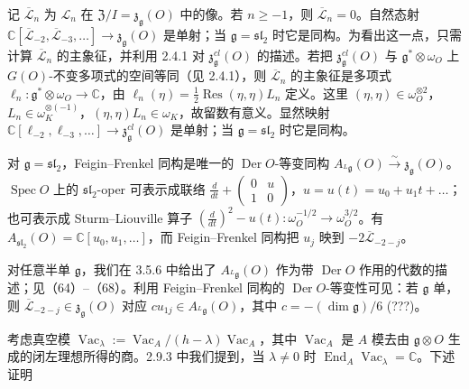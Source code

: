  记 $\overline{\mathcal{L}}_{n}$ 为 $\mathcal{L}_{n}$ 在 $\mathfrak{Z}/I = \mathfrak{z}_{\mathfrak{g}}(O)$ 中的像。若 $n \ge -1$，则 $\overline{\mathcal{L}}_{n} = 0$。自然态射 $\mathbb{C}[\overline{\mathcal{L}}_{-2}, \overline{\mathcal{L}}_{-3}, \ldots] \to \mathfrak{z}_{\mathfrak{g}}(O)$ 是单射；当 $\mathfrak{g} = \mathfrak{sl}_{2}$ 时它是同构。为看出这一点，只需计算 $\overline{\mathcal{L}}_{n}$ 的主象征，并利用 2.4.1 对 $\mathfrak{z}^{cl}_{\mathfrak{g}}(O)$ 的描述。若把 $\mathfrak{z}^{cl}_{\mathfrak{g}}(O)$ 与 $\mathfrak{g}^{*}\otimes\omega_{O}$ 上 $G(O)$-不变多项式的空间等同（见 2.4.1），则 $\overline{\mathcal{L}}_{n}$ 的主象征是多项式 $\ell_{n}: \mathfrak{g}^{*}\otimes\omega_{O} \to \mathbb{C}$，由 $\ell_{n}(\eta) = \frac{1}{2}\operatorname{Res}(\eta, \eta)L_{n}$ 定义。这里 $(\eta, \eta) \in \omega_{O}^{\otimes 2}$，$L_{n} \in \omega_{K}^{\otimes(-1)}$，$(\eta, \eta)L_{n} \in \omega_{K}$，故留数有意义。显然映射 $\mathbb{C}[\ell_{-2}, \ell_{-3}, \ldots] \to \mathfrak{z}^{cl}_{\mathfrak{g}}(O)$ 是单射；当 $\mathfrak{g} = \mathfrak{sl}_{2}$ 时它是同构。

对 $\mathfrak{g} = \mathfrak{sl}_{2}$，Feigin--Frenkel 同构是唯一的 $\operatorname{Der} O$-等变同构 $A_{{}^{L}\mathfrak{g}}(O) \xrightarrow{\sim} \mathfrak{z}_{\mathfrak{g}}(O)$。$\operatorname{Spec} O$ 上的 $\mathfrak{sl}_{2}$-oper 可表示成联络 $\frac{d}{dt} + \begin{pmatrix} 0 & u \\ 1 & 0 \end{pmatrix}$，$u = u(t) = u_{0} + u_{1}t + \ldots$；也可表示成 Sturm--Liouville 算子 $(\frac{d}{dt})^{2} - u(t): \omega_{O}^{-1/2} \to \omega_{O}^{3/2}$。有 $A_{\mathfrak{sl}_{2}}(O) = \mathbb{C}[u_{0}, u_{1}, \ldots]$，而 Feigin--Frenkel 同构把 $u_{j}$ 映到 $-2\overline{\mathcal{L}}_{-2-j}$。

对任意半单 $\mathfrak{g}$，我们在 3.5.6 中给出了 $A_{{}^{L}\mathfrak{g}}(O)$ 作为带 $\operatorname{Der} O$ 作用的代数的描述；见（64）--（68）。利用 Feigin--Frenkel 同构的 $\operatorname{Der} O$-等变性可见：若 $\mathfrak{g}$ 单，则 $\overline{\mathcal{L}}_{-2-j} \in \mathfrak{z}_{\mathfrak{g}}(O)$ 对应 $cu_{1j} \in A_{{}^{L}\mathfrak{g}}(O)$，其中 $c = -(\dim\mathfrak{g})/6$ (???)。

 考虑真空模 $\operatorname{Vac}_{\lambda} := \operatorname{Vac}_{A}/(h-\lambda)\operatorname{Vac}_{A}$，其中 $\operatorname{Vac}_{A}$ 是 $A$ 模去由 $\mathfrak{g}\otimes O$ 生成的闭左理想所得的商。2.9.3 中我们提到，当 $\lambda \ne 0$ 时 $\operatorname{End}_{A}\operatorname{Vac}_{\lambda} = \mathbb{C}$。下述证明

